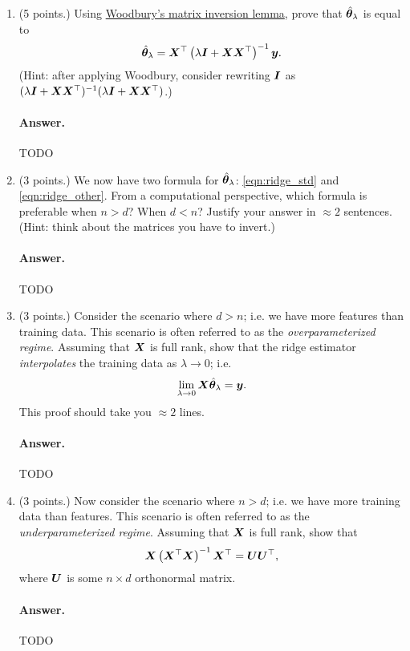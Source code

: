 \documentclass[11pt,letterpaper]{article}
\newenvironment{answer}{%
    \vspace{1em}
    \color{black}
    \paragraph{Answer.}
  }{%
    \vspace{1em}
  }
\begin{document}
\begin{enumerate}
  \item (5 points.)
    Using \href{https://en.wikipedia.org/wiki/Woodbury_matrix_identity}{Woodbury's matrix inversion lemma},
    prove that $\hat{{\bm{\theta}}}_\lambda$ is equal to
    \begin{equation}
      \hat{{\bm{\theta}}}_\lambda = {\bm{X}}^\top \left( \lambda {\bm{I}} + {\bm{X}} {\bm{X}}^\top \right)^{-1} {\bm{y}}.
      \label{eqn:ridge_other}
    \end{equation}
    (Hint: after applying Woodbury, consider rewriting ${\bm{I}}$ as
    $(\lambda {\bm{I}} + {\bm{X}} {\bm{X}}^\top)^{-1} (\lambda {\bm{I}} + {\bm{X}} {\bm{X}}^\top)$.)

\begin{answer}
  TODO
\end{answer}

  \item (3 points.)
    We now have two formula for $\hat{{\bm{\theta}}}_\lambda$: \cref{eqn:ridge_std} and \cref{eqn:ridge_other}.
    From a computational perspective, which formula is preferable when $n > d$?
    When $d < n$?
    Justify your answer in $\approx 2$ sentences.
    (Hint: think about the matrices you have to invert.)

\begin{answer}
  TODO
\end{answer}

  \item (3 points.)
    Consider the scenario where $d > n$; i.e. we have more features than training data.
    This scenario is often referred to as the \emph{overparameterized regime}.
    Assuming that ${\bm{X}}$ is full rank,
    show that the ridge estimator \emph{interpolates} the training data as $\lambda \to 0$;
    i.e.
    \[
      \lim_{\lambda \to 0} {\bm{X}} \hat{{\bm{\theta}}}_\lambda = {\bm{y}}.
    \]
    This proof should take you $\approx 2$ lines.

\begin{answer}
  TODO
\end{answer}

  \item (3 points.)
    Now consider the scenario where $n > d$; i.e. we have more training data than features.
    This scenario is often referred to as the \emph{underparameterized regime}.
    Assuming that ${\bm{X}}$ is full rank,
    show that
    \[
      {\bm{X}} \left( {\bm{X}}^\top {\bm{X}} \right)^{-1} {\bm{X}}^\top = {\bm{U}} {\bm{U}}^\top,
    \]
    where ${\bm{U}}$ is some $n \times d$ orthonormal matrix.

\begin{answer}
  TODO
\end{answer}


\end{enumerate}
\end{document}
